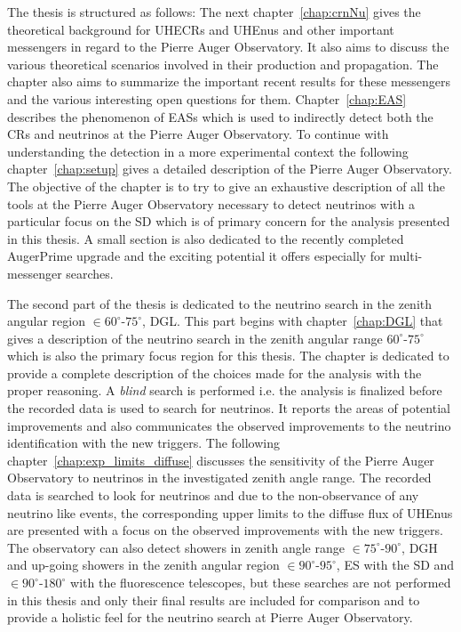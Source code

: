 The thesis is structured as follows: The next chapter~\ref{chap:crnNu} gives the theoretical background for \glspl{UHECR} and \glspl{UHEnu} and other important messengers in regard to the Pierre Auger Observatory. It also aims to discuss the various theoretical scenarios involved in their production and propagation. The chapter also aims to summarize the important recent results for these messengers and the various interesting open questions for them. Chapter~\ref{chap:EAS} describes the phenomenon of \glspl{EAS} which is used to indirectly detect both the \glspl{CR} and neutrinos at the Pierre Auger Observatory. To continue with understanding the detection in a more experimental context the following chapter~\ref{chap:setup} gives a detailed description of the Pierre Auger Observatory. The objective of the chapter is to try to give an exhaustive description of all the tools at the Pierre Auger Observatory necessary to detect neutrinos with a particular focus on the \gls{SD} which is of primary concern for the analysis presented in this thesis. A small section is also dedicated to the recently completed AugerPrime upgrade and the exciting potential it offers especially for multi-messenger searches. 

The second part of the thesis is dedicated to the neutrino search in the zenith angular region $ \in 60^\circ$-$75^\circ$, \Gls{DGL}. This part begins with chapter~\ref{chap:DGL} that gives a description of the neutrino search in the zenith angular range $60^\circ$-$75^\circ$ which is also the primary focus region for this thesis. The chapter is dedicated to provide a complete description of the choices made for the analysis with the proper reasoning. A \textit{blind} search is performed i.e. the analysis is finalized before the recorded data is used to search for neutrinos. It reports the areas of potential improvements and also communicates the observed improvements to the neutrino identification with the new triggers. The following chapter~\ref{chap:exp_limits_diffuse} discusses the sensitivity of the Pierre Auger Observatory to neutrinos in the investigated zenith angle range. The recorded data is searched to look for neutrinos and due to the non-observance of any neutrino like events, the corresponding upper limits to the diffuse flux of \glspl{UHEnu} are presented with a focus on the observed improvements with the new triggers. The observatory can also detect showers in zenith angle range $\in 75^\circ$-$90^\circ$, \Gls{DGH} and up-going showers in the zenith angular region $ \in 90^\circ$-$95^\circ$, \Gls{ES} with the \gls{SD} and $\in 90^\circ$-$180^\circ$ with the fluorescence telescopes, but these searches are not performed in this thesis and only their final results are included for comparison and to provide a holistic feel for the neutrino search at Pierre Auger Observatory.

